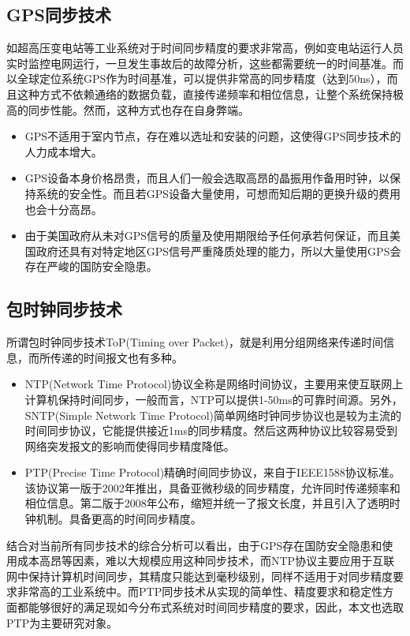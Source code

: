 \subsection{GPS同步技术}
如超高压变电站等工业系统对于时间同步精度的要求非常高，例如变电站运行人员实时监控电网运行，一旦发生事故后的故障分析，这些都需要统一的时间基准。而以全球定位系统GPS作为时间基准，可以提供非常高的同步精度（达到50ns），而且这种方式不依赖通络的数据负载，直接传递频率和相位信息，让整个系统保持极高的同步性能。然而，这种方式也存在自身弊端。
\begin{itemize}[noitemsep,topsep=0pt,parsep=0pt,partopsep=0pt]
	\item GPS不适用于室内节点，存在难以选址和安装的问题，这使得GPS同步技术的人力成本增大。
	\item GPS设备本身价格昂贵，而且人们一般会选取高昂的晶振用作备用时钟，以保持系统的安全性。而且若GPS设备大量使用，可想而知后期的更换升级的费用也会十分高昂。
	\item 由于美国政府从未对GPS信号的质量及使用期限给予任何承若何保证，而且美国政府还具有对特定地区GPS信号严重降质处理的能力，所以大量使用GPS会存在严峻的国防安全隐患。
\end{itemize}

\subsection{包时钟同步技术}
所谓包时钟同步技术ToP(Timing over Packet)，就是利用分组网络来传递时间信息，而所传递的时间报文也有多种。
\begin{itemize}[noitemsep,topsep=0pt,parsep=0pt,partopsep=0pt]
	\item  NTP(Network Time Protocol)协议全称是网络时间协议，主要用来使互联网上计算机保持时间同步，一般而言，NTP可以提供1-50ms的可靠时间源。另外，SNTP(Simple Network Time Protocol)简单网络时钟同步协议也是较为主流的时间同步协议，它能提供接近1ms的同步精度。然后这两种协议比较容易受到网络突发报文的影响而使得同步精度降低。
	\item PTP(Precise Time Protocol)精确时间同步协议，来自于IEEE1588协议标准\supercite{2}。该协议第一版于2002年推出，具备亚微秒级的同步精度，允许同时传递频率和相位信息。第二版于2008年公布，缩短并统一了报文长度，并且引入了透明时钟机制。具备更高的时间同步精度。
\end{itemize}

结合对当前所有同步技术的综合分析可以看出，由于GPS存在国防安全隐患和使用成本高昂等因素，难以大规模应用这种同步技术，而NTP协议主要应用于互联网中保持计算机时间同步，其精度只能达到毫秒级别，同样不适用于对同步精度要求非常高的工业系统中。而PTP同步技术从实现的简单性、精度要求和稳定性方面都能够很好的满足现如今分布式系统对时间同步精度的要求，因此，本文也选取PTP为主要研究对象。

